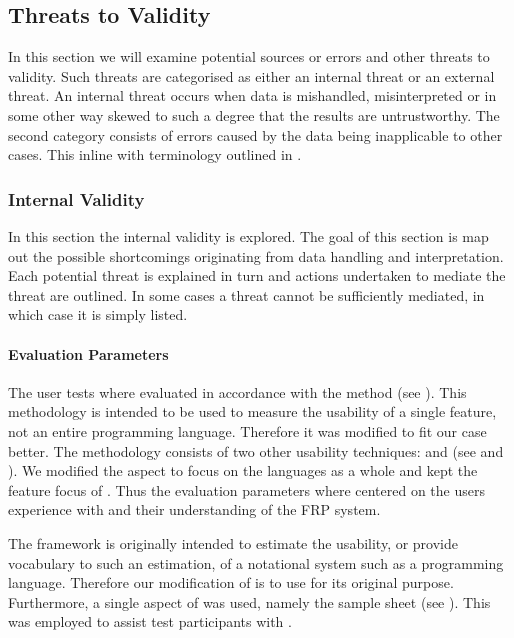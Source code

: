 \discount\subsection{Threats to Validity} \label{sec:validity}
In this section we will examine potential sources or errors and other threats to validity. Such threats are categorised as either an internal threat or an external threat. An internal threat occurs when data is mishandled, misinterpreted or in some other way skewed to such a degree that the results are untrustworthy. The second category consists of errors caused by the data being inapplicable to other cases. This inline with terminology outlined in \cite{mcleod:validity}.


\subsubsection{Internal Validity}
In this section the internal validity is explored. The goal of this section is map out the possible  shortcomings originating from data handling and interpretation. Each potential threat is explained in turn and actions undertaken to mediate the threat are outlined. In some cases a threat cannot be sufficiently mediated, in which case it is simply listed.

\paragraph{Evaluation Parameters}
The user tests where evaluated in accordance with the \champagne method (see ). This methodology is intended to be used to measure the usability of a single feature, not an entire programming language. Therefore it was modified to fit our case better. The methodology consists of two other usability techniques: \cognitive and \attentions (see  and ). We modified the \cognitive aspect to focus on the languages as a whole and kept the feature focus of \attention. Thus the evaluation parameters where centered on the users experience with \fs and their understanding of the \gls{FRP} system.

The \cognitive framework is originally intended to  estimate the usability, or provide vocabulary to such an estimation, of a notational system such as a programming language. Therefore our modification of \champagne is to use \cognitive for its original purpose. Furthermore, a single aspect of \discount was used, namely the sample sheet (see ). This was employed to assist test participants with \fs.

